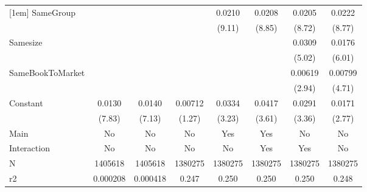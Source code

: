 {\begin{tabular}{l*{7}{c}}
[1em]
SameGroup           &                     &                     &                     &      0.0210\sym{***}&      0.0208\sym{***}&      0.0205\sym{***}&      0.0222\sym{***}\\
                    &                     &                     &                     &      (9.11)         &      (8.85)         &      (8.72)         &      (8.77)         \\
[1em]
Samesize            &                     &                     &                     &                     &                     &      0.0309\sym{***}&      0.0176\sym{***}\\
                    &                     &                     &                     &                     &                     &      (5.02)         &      (6.01)         \\
[1em]
SameBookToMarket    &                     &                     &                     &                     &                     &     0.00619\sym{**} &     0.00799\sym{***}\\
                    &                     &                     &                     &                     &                     &      (2.94)         &      (4.71)         \\
[1em]
Constant            &      0.0130\sym{***}&      0.0140\sym{***}&     0.00712         &      0.0334\sym{**} &      0.0417\sym{***}&      0.0291\sym{***}&      0.0171\sym{**} \\
                    &      (7.83)         &      (7.13)         &      (1.27)         &      (3.23)         &      (3.61)         &      (3.36)         &      (2.77)         \\
\hline
Main                &          No         &          No         &          No         &         Yes         &         Yes         &          No         &          No         \\
Interaction         &          No         &          No         &          No         &          No         &         Yes         &         Yes         &          No         \\
N                   &     1405618         &     1405618         &     1380275         &     1380275         &     1380275         &     1380275         &     1380275         \\
r2                  &    0.000208         &    0.000418         &       0.247         &       0.250         &       0.250         &       0.250         &       0.248         \\

\end{tabular}}
